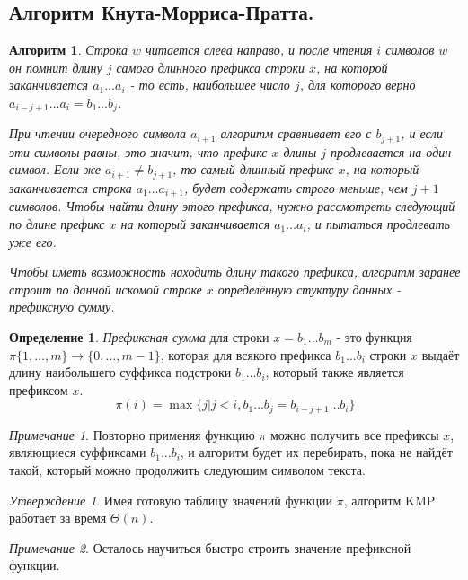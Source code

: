\documentclass[a4paper]{article}
\theoremstyle{indented}
\newtheorem{alg}{Алгоритм}
\theoremstyle{definition}
\newtheorem{defn}{Определение}
\theoremstyle{remark}
\newtheorem{remark}{Примечание}
\newtheorem{stat}{Утверждение}
\begin{document}
\subsection{Алгоритм Кнута-Морриса-Пратта.}

\begin{alg}
    Строка $w$ читается слева направо, и после чтения $i$ символов $w$ он помнит длину $j$ самого длинного префикса строки $x$, на которой заканчивается $a_1 \ldots a_i$ - то есть, наибольшее число $j$, для которого верно $a_{i-j+1}\ldots a_i=b_1\ldots b_j$. \ 

    При чтении очередного символа $a_{i+1}$ алгоритм сравнивает его с $b_{j+1}$, и если эти символы равны, это значит, что префикс $x$ длины $j$ продлевается на один символ. Если же $a_{i+1}\neq b_{j+1}$, то самый длинный префикс $x$, на который заканчивается строка $a_1\ldots a_{i+1}$, будет содержать строго меньше, чем $j+1$ символов. Чтобы найти длину этого префикса, нужно рассмотреть следующий по длине префикс $x$ на который заканчивается $a_1\ldots a_i$, и пытаться продлевать уже его. \ 

    Чтобы иметь возможность находить длину такого префикса, алгоритм заранее строит по данной искомой строке $x$ определённую стуктуру данных - \textit{префиксную сумму}.
\end{alg}

\begin{defn}
    \textit{Префиксная сумма} для строки $x=b_1\ldots b_m$ - это функция $\pi\{1, \ldots, m\}\rightarrow \{0, \ldots, m-1\}$, которая для всякого префикса $b_1\ldots b_i$ строки $x$ выдаёт длину наибольшего суффикса подстроки $b_1\ldots b_i$, который также является префиксом $x$. 
    \[
        \pi(i)=\max\{j|j<i, b_1\ldots b_j = b_{i-j+1}\ldots b_i\} 
    \]
\end{defn}

\begin{remark}
    Повторно применяя функцию $\pi$ можно получить все префиксы $x$, являющиеся суффиксами $b_1\ldots b_i$, и алгоритм будет их перебирать, пока не найдёт такой, который можно продолжить следующим символом текста. 
\end{remark}

\begin{stat}
    Имея готовую таблицу значений функции $\pi$, алгоритм KMP работает за время $\Theta(n)$. 
\end{stat}

\begin{remark}
    Осталось научиться быстро строить значение префиксной функции.
\end{remark}
\end{document}
